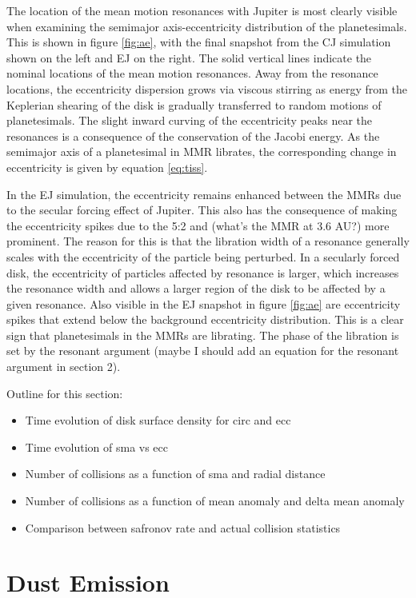 \documentclass[twocolumn]{aastex63}
\begin{document}
The location of the mean motion resonances with Jupiter is most clearly visible when examining the semimajor axis-eccentricity distribution of the planetesimals. This is shown in figure \ref{fig:ae}, with the final snapshot from the CJ simulation shown on the left and EJ on the right. The solid vertical lines indicate the nominal locations of the mean motion resonances. Away from the resonance locations, the eccentricity dispersion grows via viscous stirring as energy from the Keplerian shearing of the disk is gradually transferred to random motions of planetesimals. The slight inward curving of the eccentricity peaks near the resonances is a consequence of the conservation of the Jacobi energy. As the semimajor axis of a planetesimal in MMR librates, the corresponding change in eccentricity is given by equation \ref{eq:tiss}.

In the EJ simulation, the eccentricity remains enhanced between the MMRs due to the secular forcing effect of Jupiter. This also has the consequence of making the eccentricity spikes due to the 5:2 and (what's the MMR at 3.6 AU?) more prominent. The reason for this is that the libration width of a resonance generally scales with the eccentricity of the particle being perturbed. In a secularly forced disk, the eccentricity of particles affected by resonance is larger, which increases the resonance width and allows a larger region of the disk to be affected by a given resonance. Also visible in the EJ snapshot in figure \ref{fig:ae} are eccentricity spikes that extend below the background eccentricity distribution. This is a clear sign that planetesimals in the MMRs are librating. The phase of the libration is set by the resonant argument (maybe I should add an equation for the resonant argument in section 2).

Outline for this section:
\begin{itemize}
\item Time evolution of disk surface density for circ and ecc
\item Time evolution of sma vs ecc
\item Number of collisions as a function of sma and radial distance
\item Number of collisions as a function of mean anomaly and delta mean anomaly
\item Comparison between safronov rate and actual collision statistics
\end{itemize}

\section{Dust Emission} \label{sec:dust}
\end{document}
